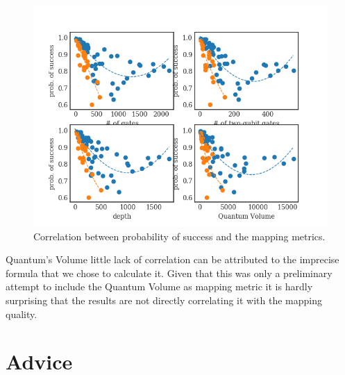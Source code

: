 \begin{figure}[htbp]
\centering
\includegraphics[width=\textwidth]{figures/ps_metrics_correlation.png}
\caption{\label{fig:org4252ccd}
Correlation between probability of success and the mapping metrics.}
\end{figure}



Quantum's Volume little lack of correlation can be attributed to the imprecise formula that we chose to calculate it.
Given that this was only a preliminary attempt to include the Quantum Volume as mapping metric it is hardly surprising that the results are not directly correlating it with the mapping quality.

\section{Advice}
\label{sec:orgf21ac6b}
